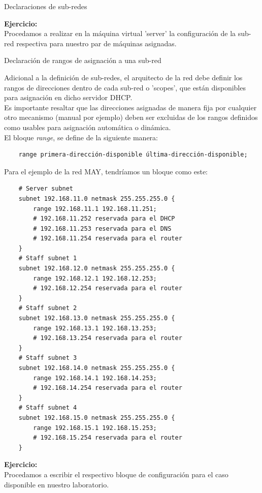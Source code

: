 \begin{frame}{Declaraciones de sub-redes}
    \framebreak
    
    \textbf{Ejercicio:}\\[0.2cm]

    Procedamos a realizar en la máquina virtual 'server' la configuración de la
    sub-red respectiva para nuestro par de máquinas asignadas.

\end{frame}

\begin{frame}{Declaración de rangos de asignación a una
sub-red}
    
    Adicional a la definición de sub-redes, el arquitecto de la red debe
    definir los rangos de direcciones dentro de cada sub-red o 'scopes', que
    están disponibles para asignación en dicho servidor DHCP.\\[0.2cm]

    Es importante resaltar que las direcciones asignadas de manera fija por
    cualquier otro mecanismo (manual por ejemplo) deben ser excluidas de los
    rangos definidos como usables para asignación automática o
    dinámica.\\[0.2cm]

    El bloque \textit{range}, se define de la siguiente manera:

    \begin{verbatim}
    range primera-dirección-disponible última-dirección-disponible;
    \end{verbatim}

    Para el ejemplo de la red MAY, tendríamos un bloque como este:

    \begin{verbatim}
    # Server subnet
    subnet 192.168.11.0 netmask 255.255.255.0 {
        range 192.168.11.1 192.168.11.251;
        # 192.168.11.252 reservada para el DHCP 
        # 192.168.11.253 reservada para el DNS 
        # 192.168.11.254 reservada para el router 
    }
    # Staff subnet 1
    subnet 192.168.12.0 netmask 255.255.255.0 {
        range 192.168.12.1 192.168.12.253;
        # 192.168.12.254 reservada para el router 
    }
    # Staff subnet 2
    subnet 192.168.13.0 netmask 255.255.255.0 {
        range 192.168.13.1 192.168.13.253;
        # 192.168.13.254 reservada para el router 
    }
    # Staff subnet 3
    subnet 192.168.14.0 netmask 255.255.255.0 {
        range 192.168.14.1 192.168.14.253;
        # 192.168.14.254 reservada para el router 
    }
    # Staff subnet 4
    subnet 192.168.15.0 netmask 255.255.255.0 {
        range 192.168.15.1 192.168.15.253;
        # 192.168.15.254 reservada para el router 
    }
    \end{verbatim}

    \framebreak

    \textbf{Ejercicio:}\\[0.2cm]

    Procedamos a escribir el respectivo bloque de configuración para el caso
    disponible en nuestro laboratorio.

\end{frame}

